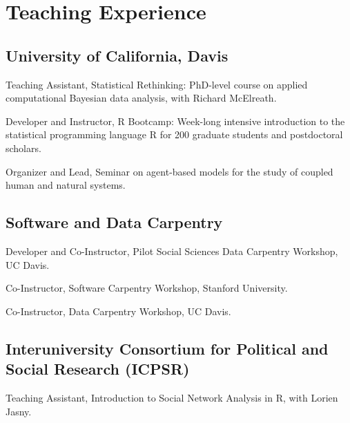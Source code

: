 \section{Teaching Experience}\label{teaching-experience}

\subsection{University of California,
Davis}\label{university-of-california-davis}

\begin{description}
\tightlist
\item[2016]
Teaching Assistant, Statistical Rethinking: PhD-level course on applied
computational Bayesian data analysis, with Richard McElreath.
\item[2015]
Developer and Instructor, R Bootcamp: Week-long intensive introduction
to the statistical programming language R for 200 graduate students and
postdoctoral scholars.
\item[2013]
Organizer and Lead, Seminar on agent-based models for the study of
coupled human and natural systems.
\end{description}

\subsection{Software and Data
Carpentry}\label{software-and-data-carpentry}

\begin{description}
\tightlist
\item[2016]
Developer and Co-Instructor, Pilot Social Sciences Data Carpentry
Workshop, UC Davis.
\item[2016]
Co-Instructor, Software Carpentry Workshop, Stanford University.
\item[2015]
Co-Instructor, Data Carpentry Workshop, UC Davis.
\end{description}

\subsection{Interuniversity Consortium for Political and Social Research
(ICPSR)}\label{interuniversity-consortium-for-political-and-social-research-icpsr}

\begin{description}
\tightlist
\item[2015]
Teaching Assistant, Introduction to Social Network Analysis in R, with
Lorien Jasny.
\end{description}

